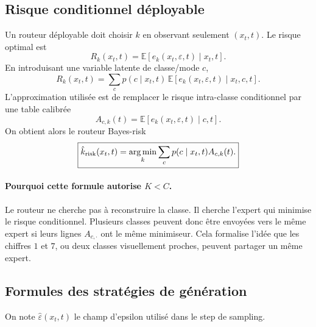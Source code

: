\documentclass[11pt,a4paper]{article}
\newcommand{\E}{\mathbb{E}}
\newcommand{\argmin}{\operatorname*{arg\,min}}
\newcommand{\1}{\mathbf{1}}
\newcommand{\eps}{\varepsilon}
\newcommand{\xt}{x_t}
\begin{document}
\subsection{Risque conditionnel déployable}

Un routeur déployable doit choisir $k$ en observant seulement $(\xt,t)$. Le risque optimal est
\begin{equation}
 R_k(\xt,t)=\E[e_k(\xt,\eps,t)\mid \xt,t].
\label{eq:cond_risk_exact}
\end{equation}
En introduisant une variable latente de classe/mode $c$,
\begin{equation}
R_k(\xt,t)=\sum_c p(c\mid\xt,t)\,\E[e_k(\xt,\eps,t)\mid \xt,c,t].
\label{eq:risk_exact_class}
\end{equation}
L'approximation utilisée est de remplacer le risque intra-classe conditionnel par une table calibrée
\begin{equation}
A_{c,k}(t)=\E[e_k(\xt,\eps,t)\mid c,t].
\label{eq:A_ck}
\end{equation}
On obtient alors le routeur Bayes-risk
\begin{equation}
\boxed{
\hat k_{\rm risk}(\xt,t)=\argmin_k \sum_c p(c\mid\xt,t)A_{c,k}(t).
}
\label{eq:bayes_risk_router}
\end{equation}

\paragraph{Pourquoi cette formule autorise $K<C$.}
Le routeur ne cherche pas à reconstruire la classe. Il cherche l'expert qui minimise le risque conditionnel. Plusieurs classes peuvent donc être envoyées vers le même expert si leurs lignes $A_{c,\cdot}$ ont le même minimiseur. Cela formalise l'idée que les chiffres $1$ et $7$, ou deux classes visuellement proches, peuvent partager un même expert.

\subsection{Formules des stratégies de génération}

On note $\hat\eps(\xt,t)$ le champ d'epsilon utilisé dans le step de sampling.
\end{document}
